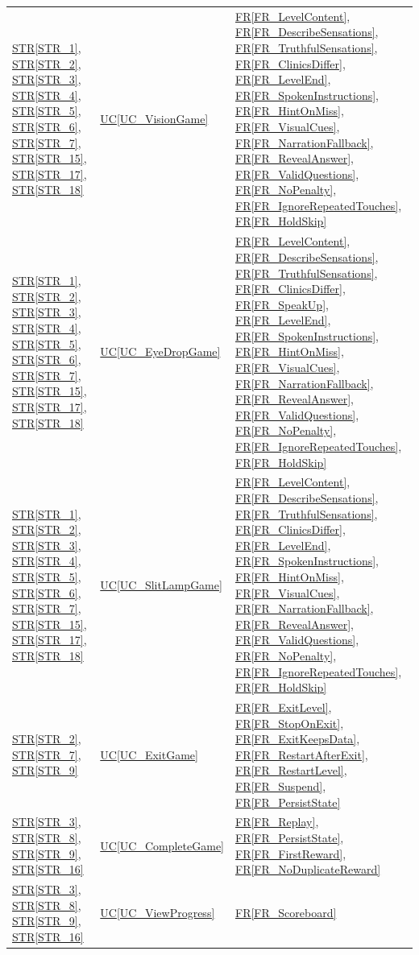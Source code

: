 \documentclass[10pt]{article}
\newcommand{\strref}[1]{\hyperref[#1]{STR\ref*{#1}}}
\newcommand{\ucref}[1]{\hyperref[#1]{UC\ref*{#1}}}
\newcommand{\rref}[1]{\hyperref[#1]{FR\ref*{#1}}}
\begin{document}
\begin{longtable}{@{}p{} p{} p{}@{}}
\strref{STR_1}, \strref{STR_2}, \strref{STR_3}, \strref{STR_4}, \strref{STR_5}, 
\strref{STR_6}, \strref{STR_7}, \strref{STR_15}, \strref{STR_17}, \strref{STR_18} 
& \ucref{UC_VisionGame} & \rref{FR_LevelContent}, \rref{FR_DescribeSensations}, \rref{FR_TruthfulSensations}, \rref{FR_ClinicsDiffer}, \rref{FR_LevelEnd}, \rref{FR_SpokenInstructions}, \rref{FR_HintOnMiss}, \rref{FR_VisualCues}, \rref{FR_NarrationFallback}, \rref{FR_RevealAnswer}, \rref{FR_ValidQuestions}, \rref{FR_NoPenalty}, \rref{FR_IgnoreRepeatedTouches}, \rref{FR_HoldSkip} \\

\strref{STR_1}, \strref{STR_2}, \strref{STR_3}, \strref{STR_4}, \strref{STR_5}, 
\strref{STR_6}, \strref{STR_7}, \strref{STR_15}, \strref{STR_17}, \strref{STR_18} 
& \ucref{UC_EyeDropGame} & \rref{FR_LevelContent}, \rref{FR_DescribeSensations}, \rref{FR_TruthfulSensations}, \rref{FR_ClinicsDiffer}, \rref{FR_SpeakUp}, \rref{FR_LevelEnd}, \rref{FR_SpokenInstructions}, \rref{FR_HintOnMiss}, \rref{FR_VisualCues}, \rref{FR_NarrationFallback}, \rref{FR_RevealAnswer}, \rref{FR_ValidQuestions}, \rref{FR_NoPenalty}, \rref{FR_IgnoreRepeatedTouches}, \rref{FR_HoldSkip} \\

\strref{STR_1}, \strref{STR_2}, \strref{STR_3}, \strref{STR_4}, \strref{STR_5}, 
\strref{STR_6}, \strref{STR_7}, \strref{STR_15}, \strref{STR_17}, \strref{STR_18} 
& \ucref{UC_SlitLampGame} & \rref{FR_LevelContent}, \rref{FR_DescribeSensations}, \rref{FR_TruthfulSensations}, \rref{FR_ClinicsDiffer}, \rref{FR_LevelEnd}, \rref{FR_SpokenInstructions}, \rref{FR_HintOnMiss}, \rref{FR_VisualCues}, \rref{FR_NarrationFallback}, \rref{FR_RevealAnswer}, \rref{FR_ValidQuestions}, \rref{FR_NoPenalty}, \rref{FR_IgnoreRepeatedTouches}, \rref{FR_HoldSkip} \\

\strref{STR_2}, \strref{STR_7}, \strref{STR_9} 
& \ucref{UC_ExitGame} & \rref{FR_ExitLevel}, \rref{FR_StopOnExit}, \rref{FR_ExitKeepsData}, \rref{FR_RestartAfterExit}, \rref{FR_RestartLevel}, \rref{FR_Suspend}, \rref{FR_PersistState} \\

\strref{STR_3}, \strref{STR_8}, \strref{STR_9}, \strref{STR_16} 
& \ucref{UC_CompleteGame} & \rref{FR_Replay}, \rref{FR_PersistState}, \rref{FR_FirstReward}, \rref{FR_NoDuplicateReward} \\

\strref{STR_3}, \strref{STR_8}, \strref{STR_9}, \strref{STR_16} 
& \ucref{UC_ViewProgress} & \rref{FR_Scoreboard} \\


\end{longtable}
\end{document}
